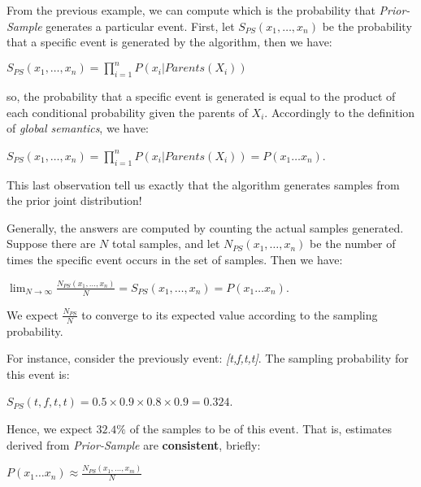 From the previous example, we can compute which is the probability that \textit{Prior-Sample} generates a particular event. First, let $S_{PS}(x_1, \dots, x_n)$ be the probability
that a specific event is generated by the algorithm, then we have:
\begin{center}
    $S_{PS}(x_1, \dots, x_n) = \prod_{i=1}^{n}P(x_i|Parents(X_i))$
\end{center}
so, the probability that a specific event is generated is equal to the product of each conditional probability given the parents of $X_i$. Accordingly to the definition of
\textit{global semantics}, we have:
\begin{center}
    $S_{PS}(x_1, \dots, x_n) = \prod_{i=1}^{n}P(x_i|Parents(X_i)) = P(x_1 \dots x_n)$.
\end{center}
This last observation tell us exactly that the algorithm generates samples from the prior joint distribution! \vspace{3.5pt}

Generally, the answers are computed by counting the actual samples generated. Suppose there are $N$ total samples, and let $N_{PS}(x_1, \dots, x_n)$ be the number of times
the specific event occurs in the set of samples. Then we have:
\begin{center}
    $\lim_{N \rightarrow \infty} \frac{N_{PS}(x_1, \dots, x_n)}{N} = S_{PS}(x_1, \dots, x_n) = P(x_1 \dots x_n)$.
\end{center}
We expect $\frac{N_{PS}}{N}$ to converge to its expected value according to the sampling probability. \vspace{3.5pt}

For instance, consider the previously event: \textit{[t,f,t,t]}. The sampling probability for this event is:
\begin{center}
    $S_{PS}(t,f,t,t) = 0.5 \times 0.9 \times 0.8 \times 0.9 = 0.324$.
\end{center} \vspace{3.5pt}

Hence, we expect $32.4\%$ of the samples to be of this event. That is, estimates derived from \textit{Prior-Sample} are \textbf{consistent}, briefly:
\begin{center}
    $P(x_1 \dots x_n) \approx \frac{N_{PS}(x_1, \dots, x_m)}{N}$
\end{center}